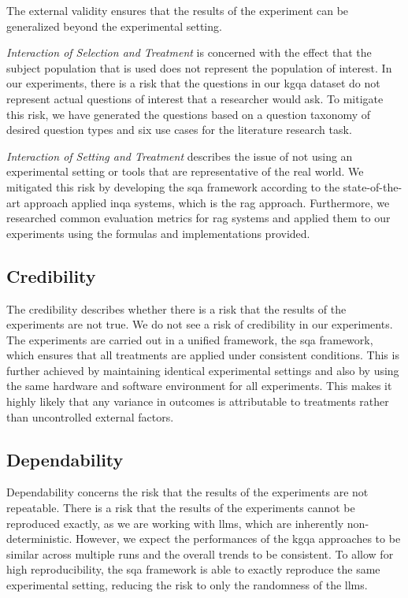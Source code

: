 The external validity ensures that the results of the experiment can be generalized beyond the experimental setting.

\emph{Interaction of Selection and Treatment} is concerned with the effect that the subject population that is used does not represent the population of interest. In our experiments, there is a risk that the questions in our \gls{kgqa} dataset do not represent actual questions of interest that a researcher would ask. To mitigate this risk, we have generated the questions based on a question taxonomy of desired question types and six use cases for the literature research task.

\emph{Interaction of Setting and Treatment} describes the issue of not using an experimental setting or tools that are representative of the real world. We mitigated this risk by developing the \gls{sqa} framework according to the state-of-the-art approach applied in\gls{qa} systems, which is the \gls{rag} approach. Furthermore, we researched common evaluation metrics for \gls{rag} systems and applied them to our experiments using the formulas and implementations provided.

\subsection{Credibility}

The credibility describes whether there is a risk that the results of the experiments are not true. We do not see a risk of credibility in our experiments. The experiments are carried out in a unified framework, the \gls{sqa} framework, which ensures that all treatments are applied under consistent conditions. This is further achieved by maintaining identical experimental settings and also by using the same hardware and software environment for all experiments. This makes it highly likely that any variance in outcomes is attributable to treatments rather than uncontrolled external factors.

\subsection{Dependability}

Dependability concerns the risk that the results of the experiments are not repeatable. There is a risk that the results of the experiments cannot be reproduced exactly, as we are working with \glspl{llm}, which are inherently non-deterministic. However, we expect the performances of the \gls{kgqa} approaches to be similar across multiple runs and the overall trends to be consistent. To allow for high reproducibility, the \gls{sqa} framework is able to exactly reproduce the same experimental setting, reducing the risk to only the randomness of the \glspl{llm}.

